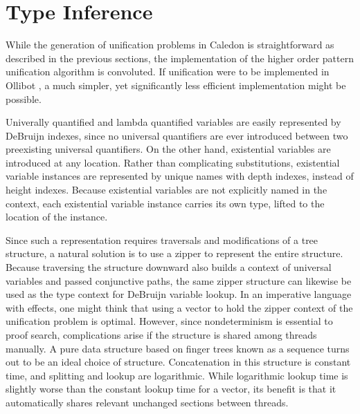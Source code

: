 \section{Type Inference}

While the generation of unification problems in Caledon is straightforward as described in the previous
sections, the implementation of the higher order pattern unification algorithm
is convoluted. If unification were to be implemented in Ollibot \citep{pfenning2009substructural}, a much simpler, 
yet significantly less efficient implementation might be possible.

Univerally quantified and lambda quantified variables
are easily represented by DeBruijn indexes, since no universal quantifiers are ever
introduced between two preexisting universal quantifiers. On the other hand, existential
variables are introduced at any location. Rather than complicating substitutions,
existential variable instances are represented by unique names with depth indexes, instead of height indexes.
Because existential variables are not explicitly named in the context, each existential variable instance carries its
own type, lifted to the location of the instance.

Since such a representation requires traversals and modifications of a tree structure,
a natural solution is to use a zipper to represent the entire structure. Because traversing the structure
downward also builds a context of universal variables and passed conjunctive
paths, the same zipper structure can likewise be used as the type context for DeBruijn variable
lookup. In an imperative language with effects, one might think that using
a vector to hold the zipper context of the unification problem is optimal. However,
since nondeterminism is essential to proof search, complications
arise if the structure is shared among threads manually.  A pure data structure based on
finger trees \citep{hinze2006finger} known as a sequence turns out to be an 
ideal choice of structure. Concatenation in this structure is constant time, and splitting and lookup are logarithmic.
While logarithmic lookup time is slightly worse than the constant lookup time for a vector, its benefit is
that it automatically shares relevant unchanged sections between threads.


    
